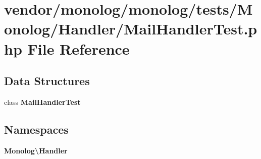 \section{vendor/monolog/monolog/tests/\+Monolog/\+Handler/\+Mail\+Handler\+Test.php File Reference}
\label{_mail_handler_test_8php}
\subsection*{Data Structures}
\begin{DoxyCompactItemize}
\item 
class {\bf Mail\+Handler\+Test}
\end{DoxyCompactItemize}
\subsection*{Namespaces}
\begin{DoxyCompactItemize}
\item 
 {\bf Monolog\textbackslash{}\+Handler}
\end{DoxyCompactItemize}
